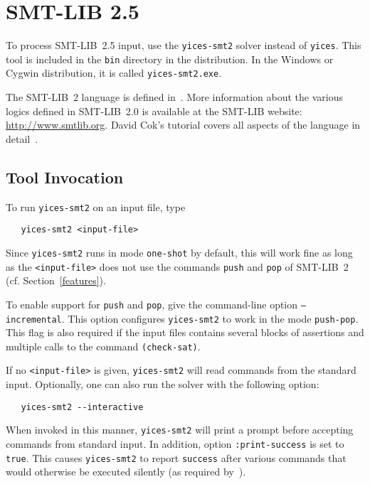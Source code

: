 \documentclass[11pt,twoside,fleqn,openright,titlepage]{cslreport}
\begin{document}
\section{SMT-LIB 2.5}

To process SMT-LIB~2.5 input, use the \texttt{yices-smt2} solver
instead of \texttt{yices}. This tool is included in the \texttt{bin}
directory in the distribution. In the Windows or Cygwin distribution,
it is called \texttt{yices-smt2.exe}.

\medskip\noindent
The SMT-LIB~2 language is defined in~\cite{SMTLIB25:2015}. More
information about the various logics defined in SMT-LIB~2.0 is
available at the SMT-LIB website: \url{http://www.smtlib.org}. David Cok's
tutorial covers all aspects of the language in
detail~\cite{SMTLIB:tutorial:2013}.


\subsection{Tool Invocation}

To run \texttt{yices-smt2} on an input file, type
\begin{small}
\begin{verbatim}
   yices-smt2 <input-file>
\end{verbatim}
\end{small}
Since \texttt{yices-smt2} runs in mode \texttt{one-shot} by default,
this will work fine as long as the \texttt{<input-file>} does not use
the commands \texttt{push} and \texttt{pop} of SMT-LIB~2
(cf. Section~\ref{features}).

\medskip\noindent To enable support for \texttt{push} and
\texttt{pop}, give the command-line option \texttt{--incremental}.
This option configures \texttt{yices-smt2} to work in the mode
\texttt{push-pop}. This flag is also required if the input files
contains several blocks of assertions and multiple calls to the
command \texttt{(check-sat)}.

\medskip\noindent If no \texttt{<input-file>} is given,
\texttt{yices-smt2} will read commands from the standard
input. Optionally, one can also run the solver with
the following option:
\begin{small}
\begin{verbatim}
   yices-smt2 --interactive
\end{verbatim}
\end{small}
When invoked in this manner, \texttt{yices-smt2} will print a prompt
before accepting commands from standard input. In addition, option
\texttt{:print-success} is set to \texttt{true}. This causes
\texttt{yices-smt2} to report \texttt{success} after various commands
that would otherwise be executed silently (as required
by~\cite{SMTLIB25:2015}).
\end{document}
